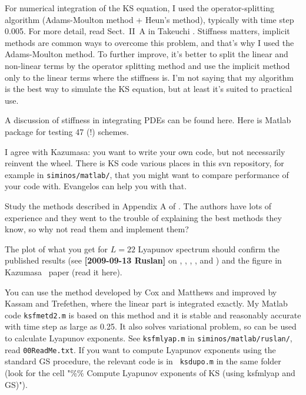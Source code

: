 \begin{description}
For numerical integration of the KS equation, I used the
operator-splitting algorithm (Adams-Moulton method + Heun's method),
typically with time step 0.005. For more detail, read Sect.~II~A in
Takeuchi \etal{}. Stiffness matters, implicit methods are
common ways to overcome this problem,
 and that's why I used the Adams-Moulton method. To further improve,
it's better to split the linear and non-linear terms
 by the operator splitting method and use the implicit method only to
 the linear terms where the stiffness is.
I'm not saying that my algorithm is the best way to simulate the KS
equation, but at least it's suited to practical use.

\item[2013-06-27 Predrag  to Xiong Ding]
A discussion of stiffness in integrating PDEs can be found
{here}.  {Here} is Matlab
package for testing 47 (!) schemes.

I agree with Kazumasa: you want to write your own code,
but not necessarily reinvent the wheel. There is KS code various
places in this svn repository, for example in
\texttt{siminos/matlab/}, that you might want to compare performance
of your code with. Evangelos can help you with that.


Study the methods described in
{Appendix A} of .
The authors have lots of experience and they went to the
    trouble of explaining the best methods they know, so why not read
    them and implement them?

The plot of what you get for $L=22$
Lyapunov spectrum should confirm the published results (see
{\bf [2009-09-13 Ruslan]} on ,
, ,
, and ) and the
figure in Kazumasa \etal\
paper (read it
 {here}).

\item[2013-06-27 Ruslan]
You can use the method developed by Cox and
Matthews and improved by Kassam and
Trefethen, where the linear part is integrated exactly.
My Matlab code {\tt ksfmetd2.m} is based on this method and it is
stable and reasonably accurate with time step as large as 0.25.  It
also solves variational problem, so can be used to calculate Lyapunov
exponents.  See {\tt ksfmlyap.m} in {\tt siminos/matlab/ruslan/},
read {\tt 00ReadMe.txt}.  If you want to compute Lyapunov exponents
using the standard GS procedure, the relevant code is in {\tt
ksdupo.m} in the same folder (look for the cell "\%\% Compute
Lyapunov exponents of KS (using ksfmlyap and GS)").


\end{description}
